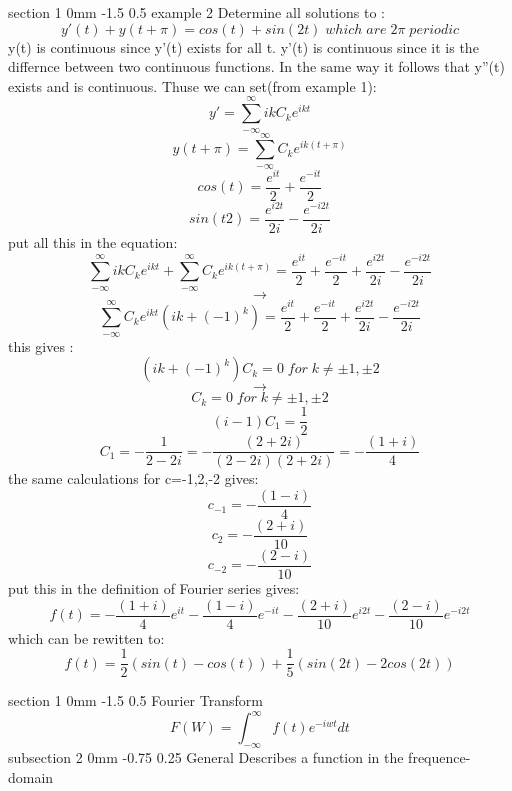 \documentclass[a4paper,11pt]{article}
\makeatletter
\renewcommand{\section}{\@startsection
   {section}%
   {1}%
   {0mm}%
   {-1.5\baselineskip}%
   {0.5\baselineskip}%
   {\sffamily\bfseries\upshape\normalsize}}%
\renewcommand{\subsection}{\@startsection
   {subsection}%
   {2}%
   {0mm}%
   {-0.75\baselineskip}%
   {0.25\baselineskip}%
   {\rmfamily\normalfont\slshape\normalsize}}%
\makeatother
\begin{document}
\section{example 2}
Determine all solutions to :
$$y'(t)+y(t+\pi)=cos(t)+sin(2t) \;which \;are\;2\pi \;periodic $$
y(t) is continuous since y'(t) exists for all t. y'(t) is continuous since it is the differnce between two continuous functions. In the same way it follows that y''(t) exists and is continuous. Thuse we can set(from example 1):
$$y'=\sum_{-\infty}^{\infty}ikC_ke^{ikt}$$
$$y(t+\pi)=\sum_{-\infty}^{\infty}C_ke^{ik(t+\pi)}$$
$$cos(t)=\dfrac{e^{it}}{2}+\dfrac{e^{-it}}{2}$$
$$sin(t2)=\dfrac{e^{i2t}}{2i}-\dfrac{e^{-i2t}}{2i}$$
put all this in the equation:
$$\sum_{-\infty}^{\infty}ikC_ke^{ikt}+\sum_{-\infty}^{\infty}C_ke^{ik(t+\pi)}=\dfrac{e^{it}}{2}+\dfrac{e^{-it}}{2}+\dfrac{e^{i2t}}{2i}-\dfrac{e^{-i2t}}{2i}$$
$$\rightarrow$$
$$\sum_{-\infty}^{\infty}C_ke^{ikt}(ik+(-1)^k)=\dfrac{e^{it}}{2}+\dfrac{e^{-it}}{2}+\dfrac{e^{i2t}}{2i}-\dfrac{e^{-i2t}}{2i}$$
this gives :
$$(ik+(-1)^k)C_k=0 \;for\; k\ne\pm1,\pm2$$
$$\rightarrow$$
$$C_k=0 \;for \;k\ne\pm1,\pm2$$
$$(i-1)C_1=\dfrac{1}{2}$$
$$C_1=-\dfrac{1}{2-2i}=-\dfrac{(2+2i)}{(2-2i)(2+2i)}=-\dfrac{(1+i)}{4}$$
the same calculations for c=-1,2,-2 gives:
$$c_{-1}=-\dfrac{(1-i)}{4}$$
$$c_{2}=-\dfrac{(2+i)}{10}$$
$$c_{-2}=-\dfrac{(2-i)}{10}$$
put this in the definition of Fourier series gives:
$$f(t)=-\dfrac{(1+i)}{4}e^{it}-\dfrac{(1-i)}{4}e^{-it}-\dfrac{(2+i)}{10}e^{i2t}-\dfrac{(2-i)}{10}e^{-i2t}$$
which can be rewitten to:
$$f(t)=\dfrac{1}{2}(sin(t)-cos(t))+\dfrac{1}{5}(sin(2t)-2cos(2t))$$



\section{Fourier Transform}
$$F(W)=\int_{-\infty}^{\infty} f(t)e^{-iwt}dt$$
\subsection{General}
Describes a function in the frequence-domain
\end{document}
